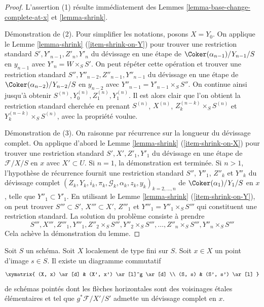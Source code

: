 \begin{proof}
L'assertion (1) résulte immédiatement des
Lemmes \ref{lemma-base-change-complete-at-x} et
\ref{lemma-shrink}.

\medskip\noindent
Démonstration de (2). Pour simplifier les notations, posons $X = Y_0$. On applique
le Lemme \ref{lemma-shrink} (\ref{item-shrink-on-Y})
pour trouver une restriction standard
$S', Y'_{n - 1}, Z'_n, Y'_n$
du d\'evissage en une étape de $\Coker(\alpha_{n - 1})/Y_{n - 1}/S$
en $y_{n - 1}$ avec $Y'_n = W \times_S S'$. On peut répéter cette opération
et trouver une restriction standard
$S'', Y''_{n - 2}, Z''_{n - 1}, Y''_{n - 1}$
du d\'evissage en une étape de $\Coker(\alpha_{n - 2})/Y_{n - 2}/S$
en $y_{n - 2}$ avec $Y''_{n - 1} = Y'_{n - 1} \times_S S''$.
On continue ainsi jusqu'à obtenir
$S^{(n)}, Y^{(n)}_0, Z^{(n)}_1, Y^{(n)}_1$.
Il est alors clair que l'on obtient la restriction standard cherchée
en prenant $S^{(n)}$, $X^{(n)}$, $Z_k^{(n - k)} \times_S S^{(n)}$ et
$Y_k^{(n - k)} \times_S S^{(n)}$, avec la propriété voulue.

\medskip\noindent
Démonstration de (3). On raisonne par récurrence sur la longueur du
d\'evissage complet. On applique d'abord
le Lemme \ref{lemma-shrink} (\ref{item-shrink-on-X})
pour trouver une restriction standard
$S', X', Z'_1, Y'_1$
du d\'evissage en une étape de $\mathcal{F}/X/S$ en $x$
avec $X' \subset U$. Si $n = 1$, la démonstration est terminée.
Si $n > 1$, l'hypothèse de récurrence fournit une restriction standard
$S''$, $Y''_1$, $Z''_k$ et $Y''_k$ du d\'evissage complet\newline
$(Z_k, Y_k, i_k, \pi_k, \mathcal{G}_k, \alpha_k, z_k, y_k)_{k = 2, \ldots, n}$
de $\Coker(\alpha_1)/Y_1/S$ en $x$, telle que
$Y''_1 \subset Y'_1$. En utilisant
le Lemme \ref{lemma-shrink} (\ref{item-shrink-on-Y}),
on peut trouver $S''' \subset S'$, $X''' \subset X'$, $Z'''_1$ et
$Y'''_1 = Y''_1 \times_S S'''$ qui constituent une restriction standard.
La solution du problème consiste à prendre
$$
S''', X''', Z'''_1, Y'''_1, Z''_2 \times_S S''',
Y''_2 \times_S S''', \ldots, Z''_n \times_S S''', Y''_n \times_S S'''
$$
Cela achève la démonstration du lemme.
\end{proof}

\begin{proposition}
\label{proposition-existence-complete-at-x}
Soit $S$ un schéma.
Soit $X$ localement de type fini sur $S$.
Soit $x \in X$ un point d'image $s \in S$.
Il existe un diagramme commutatif
$$
\xymatrix{
(X, x) \ar[d] & (X', x') \ar[l]^g \ar[d] \\
(S, s) & (S', s') \ar[l]
}
$$
de schémas pointés dont les flèches
horizontales sont des voisinages \'etales élémentaires
et tel que $g^*\mathcal{F}/X'/S'$ admette un
d\'evissage complet en $x$.
\end{proposition}

